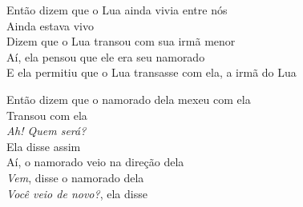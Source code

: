 \begin{linenumbers}\begingroup\raggedright
\noindent Então dizem que o Lua ainda vivia entre nós\\
Ainda estava vivo\\
Dizem que o Lua transou com sua irmã menor\\
Aí, ela pensou que ele era seu namorado\\
E ela permitiu que o Lua transasse com ela, a irmã do Lua
\end{linenumbers}\endgroup

\bigskip

\begin{linenumbers}\begingroup\raggedright
\noindent Então dizem que o namorado dela mexeu com ela\\
Transou com ela\\
\emph{Ah! Quem será?}\\
Ela disse assim\\
Aí, o namorado veio na direção dela\\
\emph{Vem}, disse o namorado dela\\
\emph{Você veio de novo?}, ela disse
\end{linenumbers}\endgroup

\bigskip

